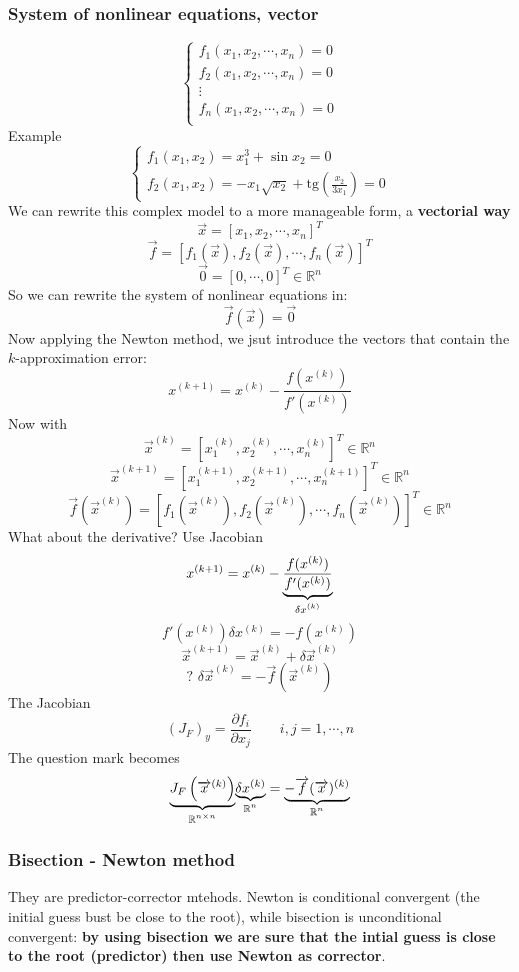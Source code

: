 \subsubsection{System of nonlinear equations, vector}
$$
\begin{cases}
    f_1(x_1,x_2,\cdots,x_n)=0\\
    f_2(x_1,x_2,\cdots,x_n)=0\\
    \vdots\\
    f_n(x_1,x_2,\cdots,x_n)=0\\
\end{cases}
$$
Example
$$
\begin{cases}
    f_1(x_1,x_2)=x_1^3+\sin x_2=0\\
    f_2(x_1,x_2)=-x_1\sqrt{x_2}+\text{tg}\left(\frac{x_2}{3x_1}\right)=0
\end{cases}
$$
We can rewrite this complex model to a more manageable form, a \textbf{vectorial way}
$$\overrightarrow{x}=[x_1,x_2,\cdots,x_n]^T$$
$$\overrightarrow{f}=[f_1(\overrightarrow{x}),f_2(\overrightarrow{x}),\cdots,f_n(\overrightarrow{x})]^T$$
$$\overrightarrow{0}=[0,\cdots,0]^T\in\mathbb{R}^n$$
So we can rewrite the system of nonlinear equations in:
$$\overrightarrow{f}(\overrightarrow{x})=\overrightarrow{0}$$
Now applying the Newton method, we jsut introduce the vectors that contain the $k$-approximation error:
$$x^{(k+1)}=x^{(k)}-\frac{f(x^{(k)})}{f'(x^{(k)})}$$
Now with
$$\overrightarrow{x}^{(k)}=\left[x_1^{(k)},x_2^{(k)},\cdots,x_n^{(k)}\right]^T\in\mathbb{R}^n$$
$$\overrightarrow{x}^{(k+1)}=\left[x_1^{(k+1)},x_2^{(k+1)},\cdots,x_n^{(k+1)}\right]^T\in\mathbb{R}^n$$
$$\overrightarrow{f}(\overrightarrow{x}^{(k)})=\left[f_1(\overrightarrow{x}^{(k)}),f_2(\overrightarrow{x}^{(k)}),\cdots,f_n(\overrightarrow{x}^{(k)})\right]^T\in\mathbb{R}^n$$
What about the derivative? Use Jacobian
$$x^{(k+1)}=x^{(k)}-\underlabel{\frac{f(x^{(k)})}{f'(x^{(k)})}}{$\delta x^{(k)}$}$$
$$f'(x^{(k)})\delta x^{(k)}=-f(x^{(k)})$$
$$\overrightarrow{x}^{(k+1)}=\overrightarrow{x}^{(k)}+\delta\overrightarrow{x}^{(k)}$$
$$?\,\,\delta\overrightarrow{x}^{(k)}=-\overrightarrow{f}(\overrightarrow{x}^{(k)})$$
The Jacobian
$$\left(J_F\right)_y=\frac{\partial f_i}{\partial x_j}\qquad i,j=1,\cdots,n$$
The question mark becomes
$$
\underlabel{J_F\left(\overrightarrow{x}^{(k)}\right)}{$\mathbb{R}^{n\times n}$}
\underlabel{\delta x^{(k)}}{$\mathbb{R}^n$}=
\underlabel{-\overrightarrow{f}(\overrightarrow{x})^{(k)}}{$\mathbb{R}^n$}
$$

\subsubsection{Bisection - Newton method}
They are predictor-corrector mtehods. Newton is conditional convergent (the initial guess bust be close to the root), while bisection is unconditional convergent: \textbf{by using bisection we are sure that the intial guess is close to the root (predictor) then use Newton as corrector}.

